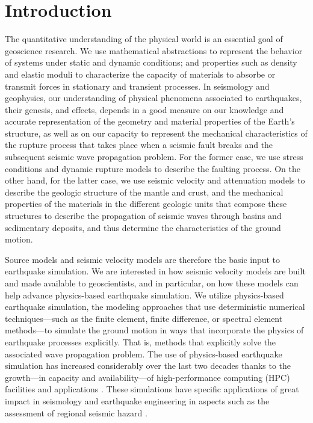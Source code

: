 
\section{Introduction}
\label{sec:introduction}

The quantitative understanding of the physical world is an essential goal of geoscience research. We use mathematical abstractions to represent the behavior of systems under static and dynamic conditions; and properties such as density and elastic moduli to characterize the capacity of materials to absorbe or transmit forces in stationary and transient processes. In seismology and geophysics, our understanding of physical phenomena associated to earthquakes, their genesis, and effects, depends in a good measure on our knowledge and accurate representation of the geometry and material properties of the Earth's structure, as well as on our capacity to represent the mechanical characteristics of the rupture process that takes place when a seismic fault breaks and the subsequent seismic wave propagation problem. For the former case, we use stress conditions and dynamic rupture models to describe the faulting process. On the other hand, for the latter case, we use seismic velocity and attenuation models to describe the geologic structure of the mantle and crust, and the mechanical properties of the materials in the different geologic units that compose these structures to describe the propagation of seismic waves through basins and sedimentary deposits, and thus determine the characteristics of the ground motion.

Source models and seismic velocity models are therefore the basic input to earthquake simulation. We are interested in how seismic velocity models are built and made available to geoscientists, and in particular, on how these models can help advance physics-based earthquake simulation. We utilize physics-based earthquake simulation, the modeling approaches that use deterministic numerical techniques---such as the finite element, finite difference, or spectral element methods---to simulate the ground motion in ways that incorporate the physics of earthquake processes explicitly. That is, methods that explicitly solve the associated wave propagation problem. The use of physics-based earthquake simulation has increased considerably over the last two decades thanks to the growth---in capacity and availability---of high-performance computing (HPC) facilities and applications \citep[e.g.,][]{Aagaard_2008_BSSA2, Olsen_2009_GRL, Bielak_2010_GJI, Cui_2010_Proc}. These simulations have specific applications of great impact in seismology and earthquake engineering in aspects such as the assessment of regional seismic hazard \citep[e.g.,][]{Graves_2011_PAG}.

